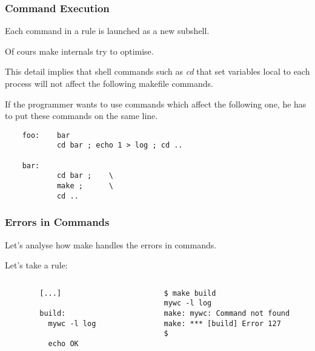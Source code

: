 \documentclass[8pt]{beamer}
\newcommand{\nl}[0]{\vspace{0.4cm}}
\begin{document}
\begin{frame}[containsverbatim]
  \frametitle{Command Execution}

  Each command in a rule is launched as a new subshell.

  \nl

  Of cours make internals try to optimise.

  \nl

  This detail implies that shell commands such as \textit{cd} that set
  variables local to each process will not affect the following makefile
  commands.

  \nl

  If the programmer wants to use commands which affect the following one, he
  has to put these commands on the same line.

  \begin{verbatim}
    foo:    bar
            cd bar ; echo 1 > log ; cd ..

    bar:
            cd bar ;    \
            make ;      \
            cd ..
  \end{verbatim}
\end{frame}


\begin{frame}[containsverbatim]
  \frametitle{Errors in Commands}

  Let's analyse how make handles the errors in commands.

  \nl

  Let's take a rule:

  \begin{columns}

    \begin{column}{6cm}
      \begin{verbatim}
        [...]

        build:
          mywc -l log

          echo OK
      \end{verbatim}
    \end{column}

    \begin{column}{6cm}
      \begin{verbatim}
        $ make build
        mywc -l log
        make: mywc: Command not found
        make: *** [build] Error 127
        $ 
      \end{verbatim}
    \end{column}

  \end{columns}
\end{frame}
\end{document}
